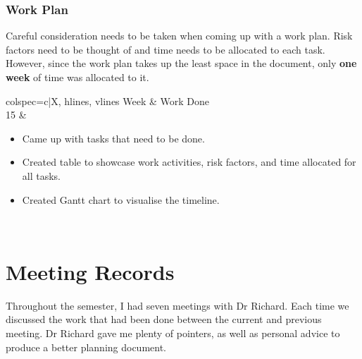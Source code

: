 \documentclass[a4paper, 12pt]{extreport}
\begin{document}
		\subsection{Work Plan}
			
			Careful consideration needs to be taken when coming up with a work plan. Risk factors need to be thought of and time needs to be allocated to each task. However, since the work plan takes up the least space in the document, only \textbf{one week} of time was allocated to it.
			
			\begin{longtblr}[
				caption = Weekly breakdown of work done for Work Plan  Chapter.
				]{colspec={c|X}, hlines, vlines}
				Week & Work Done \\
				15 & \begin{varwidth}[t]{\linewidth}
					\begin{itemize}[topsep=0pt,parsep=0pt]
						\item Came up with tasks that need to be done.
						\item Created table to showcase work activities, risk factors, and time allocated for all tasks.
						\item Created Gantt chart to visualise the timeline.
					\end{itemize}
				\end{varwidth}\\
			\end{longtblr}
		
	\nocite{*}
	\printbibliography[heading={bibnumbered}, title={Bibliography}]
	
	\chapter{Meeting Records}
		
		Throughout the semester, I had seven meetings with Dr Richard. Each time we discussed the work that had been done between the current and previous meeting. Dr Richard gave me plenty of pointers, as well as personal advice to produce a better planning document.
		
\end{document}
